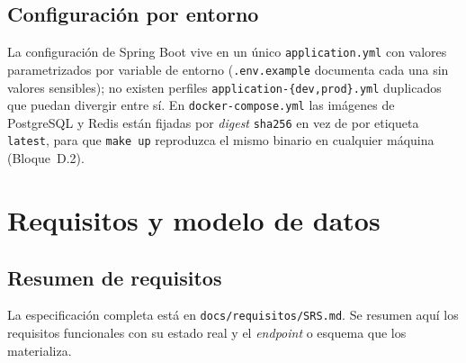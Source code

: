 \documentclass[11pt,a4paper]{article}
\newcommand{\ruta}[1]{\texttt{\footnotesize #1}}
\begin{document}
\subsection{Configuración por entorno}

La configuración de Spring Boot vive en un único \ruta{application.yml}
con valores parametrizados por variable de entorno (\ruta{.env.example}
documenta cada una sin valores sensibles); no existen perfiles
\texttt{application-\{dev,prod\}.yml} duplicados que puedan divergir
entre sí. En \ruta{docker-compose.yml} las imágenes de PostgreSQL y
Redis están fijadas por \emph{digest} \texttt{sha256} en vez de por
etiqueta \texttt{latest}, para que \texttt{make up} reproduzca el mismo
binario en cualquier máquina (Bloque~D.2).

\section{Requisitos y modelo de datos}
\label{sec:requisitos}

\subsection{Resumen de requisitos}

La especificación completa está en \ruta{docs/requisitos/SRS.md}. Se resumen
aquí los requisitos funcionales con su estado real y el \emph{endpoint} o
esquema que los materializa.
\end{document}

